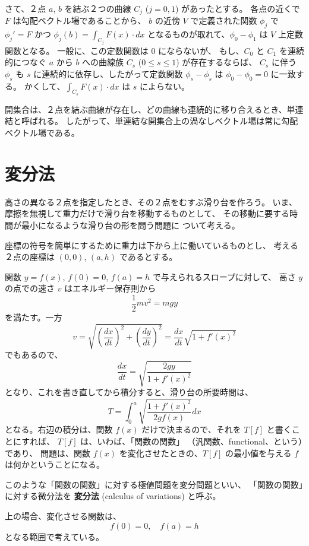 \documentclass[a4paper]{jsarticle}
\theoremstyle{definition}
\theoremstyle{remark}
\begin{document}
さて、２点 $a$, $b$ を結ぶ２つの曲線 $C_j$ ($j=0,1$) があったとする。
各点の近くで $F$ は勾配ベクトル場であることから、
$b$ の近傍 $V$ で定義された関数 $\phi_j$ で $\phi_j' = F$ かつ $\phi_j(b) = \int_{C_j} F(x)\cdot dx$
となるものが取れて、$\phi_0 - \phi_1$ は $V$ 上定数関数となる。
一般に、この定数関数は $0$ にならないが、
もし、$C_0$ と $C_1$ を連続的につなぐ $a$ から $b$ への曲線族 $C_s$ ($0 \leq s \leq 1$) が存在するならば、
$C_s$ に伴う $\phi_s$ も $s$ に連続的に依存し、したがって定数関数 $\phi_s - \phi_s$ は $\phi_0 - \phi_0 = 0$ に一致する。
かくして、$\int_{C_s}F(x)\cdot dx$ は $s$ によらない。

開集合は、２点を結ぶ曲線が存在し、どの曲線も連続的に移り合えるとき、単連結と呼ばれる。
したがって、単連結な開集合上の渦なしベクトル場は常に勾配ベクトル場である。


\bigskip
\section{変分法}

高さの異なる２点を指定したとき、その２点をむすぶ滑り台を作ろう。
いま、摩擦を無視して重力だけで滑り台を移動するものとして、
その移動に要する時間が最小になるような滑り台の形を問う問題に
ついて考える。

座標の符号を簡単にするために重力は下から上に働いているものとし、
考える２点の座標は $(0,0)$, $(a,h)$ であるとする。

関数 $y = f(x)$, $f(0) = 0$, $f(a) = h$ で与えられるスロープに対して、
高さ $y$ の点での速さ $v$ はエネルギー保存則から
\[
\frac{1}{2} mv^2 = mgy
\]
を満たす。一方
\[
v = \sqrt{ \left( \frac{dx}{dt} \right)^2 + \left( \frac{dy}{dt} \right)^2 }
= \frac{dx}{dt} \sqrt{1 + f'(x)^2} 
\]
でもあるので、
\[
\frac{dx}{dt} = \sqrt{ \frac{2gy}{1 + f'(x)^2} }
\]
となり、これを書き直してから積分すると、滑り台の所要時間は、
\[
T = \int_0^a \sqrt{ \frac{1 + f'(x)^2}{2gf(x)} } dx 
\]
となる。右辺の積分は、関数 $f(x)$ だけで決まるので、それを
$T[f]$ と書くことにすれば、 $T[f]$ は、いわば、「関数の関数」
（汎関数、functional、という）であり、
問題は、関数 $f(x)$ を変化させたときの、$T[f]$ の最小値を与える
$f$ は何かということになる。

このような「関数の関数」に対する極値問題を変分問題といい、
「関数の関数」に対する微分法を {\bf 変分法} 
(calculus of variations) と呼ぶ。

上の場合、変化させる関数は、
\[
f(0) = 0, \quad f(a) = h
\]
となる範囲で考えている。
\end{document}
